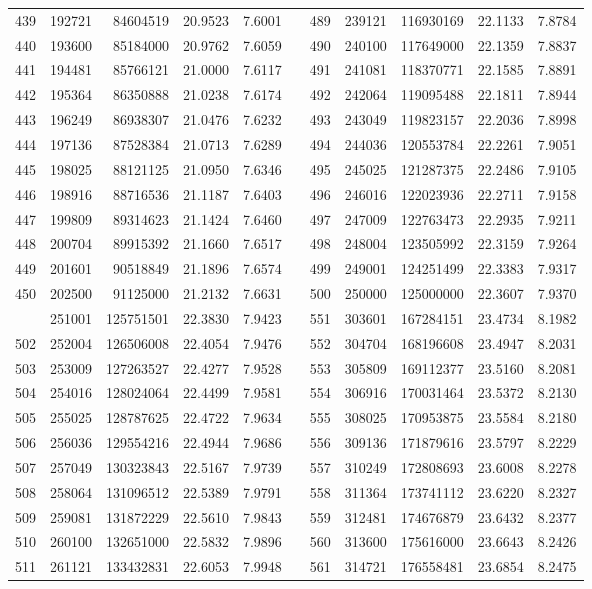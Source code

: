\begin{longtable}{rrrrrrrrrrr}
439&192721&84604519&20.9523&7.6001&&489&239121&116930169&22.1133&7.8784\\
440&193600&85184000&20.9762&7.6059&&490&240100&117649000&22.1359&7.8837\\
441&194481&85766121&21.0000&7.6117&&491&241081&118370771&22.1585&7.8891\\
442&195364&86350888&21.0238&7.6174&&492&242064&119095488&22.1811&7.8944\\
443&196249&86938307&21.0476&7.6232&&493&243049&119823157&22.2036&7.8998\\
444&197136&87528384&21.0713&7.6289&&494&244036&120553784&22.2261&7.9051\\
445&198025&88121125&21.0950&7.6346&&495&245025&121287375&22.2486&7.9105\\
446&198916&88716536&21.1187&7.6403&&496&246016&122023936&22.2711&7.9158\\
447&199809&89314623&21.1424&7.6460&&497&247009&122763473&22.2935&7.9211\\
448&200704&89915392&21.1660&7.6517&&498&248004&123505992&22.3159&7.9264\\
449&201601&90518849&21.1896&7.6574&&499&249001&124251499&22.3383&7.9317\\
450&202500&91125000&21.2132&7.6631&&500&250000&125000000&22.3607&7.9370\\
\newpage
501&251001&125751501&22.3830&7.9423&&551&303601&167284151&23.4734&8.1982\\
502&252004&126506008&22.4054&7.9476&&552&304704&168196608&23.4947&8.2031\\
503&253009&127263527&22.4277&7.9528&&553&305809&169112377&23.5160&8.2081\\
504&254016&128024064&22.4499&7.9581&&554&306916&170031464&23.5372&8.2130\\
505&255025&128787625&22.4722&7.9634&&555&308025&170953875&23.5584&8.2180\\
506&256036&129554216&22.4944&7.9686&&556&309136&171879616&23.5797&8.2229\\
507&257049&130323843&22.5167&7.9739&&557&310249&172808693&23.6008&8.2278\\
508&258064&131096512&22.5389&7.9791&&558&311364&173741112&23.6220&8.2327\\
509&259081&131872229&22.5610&7.9843&&559&312481&174676879&23.6432&8.2377\\
510&260100&132651000&22.5832&7.9896&&560&313600&175616000&23.6643&8.2426\\
511&261121&133432831&22.6053&7.9948&&561&314721&176558481&23.6854&8.2475\\

\end{longtable}
